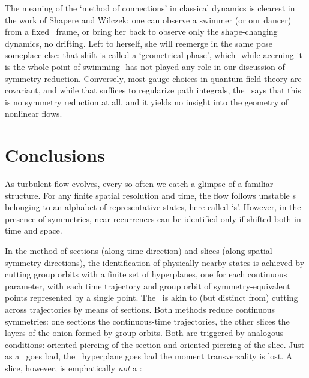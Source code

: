\documentclass[aip,cha,reprint,
secnumarabic,
nofootinbib, tightenlines,
nobibnotes, showkeys, showpacs,
groupedaddress
]{revtex4-1}
\begin{document}
The meaning of the `method of
connections' in classical dynamics is clearest in the work of Shapere
and Wilczek: one can observe a swimmer (or our dancer)
from a fixed \slice\ frame, or bring her back to observe only the
shape-changing dynamics, no drifting. Left to herself, she will reemerge
in the same pose someplace else: that shift is called a `geometrical
phase', which -while accruing it is the whole point of swimming- has not
played any role in our discussion of symmetry reduction. Conversely, most
gauge choices in quantum field theory are covariant, and while that
suffices to regularize path integrals, the \mslices\ says that this is no
symmetry reduction at all, and it yields no insight into the geometry of
nonlinear flows.



\section{Conclusions}
\label{s:concl}

As turbulent flow evolves, every so often we catch a glimpse of a
familiar structure. For any finite spatial resolution and time, the flow
follows  unstable {\cohStr s} belonging to an alphabet of representative
states, here called `\template s'. However, in the presence of
symmetries, near recurrences can be identified only if shifted both in
time and space.

In the method of sections (along time direction) and slices (along
spatial symmetry directions), the identification of physically nearby
states is achieved by cutting group orbits with a finite set of
hyperplanes, one for each continuous parameter, with each time trajectory
and group orbit of symmetry-equivalent points represented by a single
point. The \mslices\ is akin to (but distinct
from) cutting across trajectories by means of sections. Both methods
reduce continuous symmetries: one sections the continuous-time
trajectories, the other slices the layers of the onion formed by
group-orbits. Both are triggered by analogous conditions: oriented
piercing of the section and oriented piercing of the slice. Just as a
\PoincSec\ goes bad, the \slice\ hyperplane goes bad the moment
transversality is lost. A slice, however, is emphatically \emph{not} a
\PoincSec:
\end{document}
